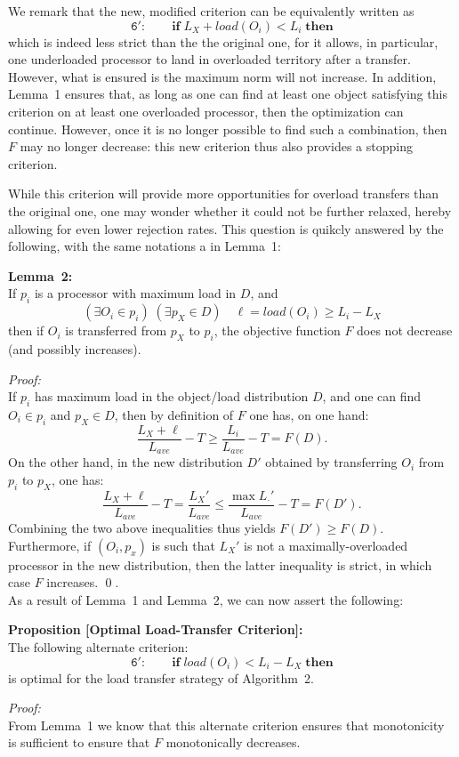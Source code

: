 We remark that the new, modified criterion can be equivalently written
as
\[
\mathtt{6':} \qquad \mathrm{\mathbf{if}} \; L_X + load(O_i) < L_i
\; \mathrm{\mathbf{then}}
\]
which is indeed less strict than the the original one, for it allows,
in particular, one underloaded processor to land in overloaded
territory after a transfer. However, what is ensured is the maximum
norm will not increase.
In addition, Lemma~1 ensures that, as long as one can find at least
one object satisfying this criterion on at least one overloaded
processor, then the optimization can continue. However, once it is no
longer possible to find such a combination, then $F$ may no longer
decrease: this new criterion thus also provides a stopping criterion.

While this criterion will provide more opportunities for overload
transfers than the original one, one may wonder whether it could not
be further relaxed, hereby allowing for even lower rejection rates.
This question is quikcly answered by the following, with the same
notations a in Lemma~1:
\par\textbf{Lemma~2:}\\
If $p_i$ is a processor with maximum load in $D$, and
\[
(\exists O_i \in p_i)\; (\exists p_X \in D) \quad \ell = load(O_i) \ge{} L_i - L_X
\]
then if $O_i$ is transferred from $p_X$ to $p_i$, the objective
function $F$ does not decrease (and possibly increases).
\par\textit{Proof:}\\
If $p_i$ has maximum load in the object/load distribution $D$, and one
can find $O_i\in{}p_i$ and $p_X\in{}D$, then by definition of $F$ one
has, on one hand:
\[
\frac{L_X + \ell}{L_{ave}} - T \ge \frac{L_i}{L_{ave}} - T = F(D).
\]
On the other hand, in the new distribution $D'$ obtained by
transferring $O_i$ from $p_i$ to $p_X$, one has:
\[
\frac{L_X + \ell}{L_{ave}} - T = \frac{L_X'}{L_{ave}}
\le \frac{\max{L_{\cdot}'}}{L_{ave}} - T = F(D').
\]
Combining the two above inequalities thus yields
$F(D')\ge{}F(D)$. Furthermore, if $(O_i,p_x)$ is such that $L_X'$ is
not a maximally-overloaded processor in the new distribution, then the
latter inequality is strict, in which case $F$ increases.
\hfill\qed.\\
As a result of Lemma~1 and Lemma~2, we can now assert the following:
\par\textbf{Proposition [Optimal Load-Transfer Criterion]:}\\
The following alternate criterion:
\[
\mathtt{6':} \qquad \mathrm{\mathbf{if}} \; load(O_i) < L_i - L_X
\; \mathrm{\mathbf{then}}
\]
is optimal for the load transfer strategy of Algorithm~2.
\par\textit{Proof:}\\
From Lemma~1 we know that this alternate criterion ensures that
monotonicity is sufficient to ensure that $F$ monotonically decreases.

